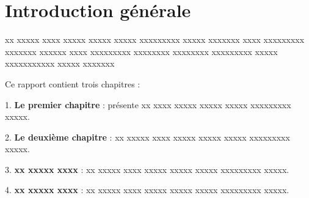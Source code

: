 \chapter*{Introduction générale}
\adjustmtc
\thispagestyle{MyStyle}

xx xxxxx xxxx xxxxx xxxxx xxxxx xxxxxxxxx xxxxx xxxxxxx xxxx xxxxxxxxx xxxxxxx xxxxxx xxxx xxxxxxxxx xxxxxxxx xxxxxxxx xxxxxxxxx xxxxx xxxxxxxxxxx xxxxx xxxxxxx 

Ce rapport contient trois chapitres :

1. \textbf{Le premier chapitre} : présente xx xxxx xxxxx xxxxx xxxxx xxxxxxxxx xxxxx.

2. \textbf{Le deuxième chapitre} : xx xxxxx xxxx xxxxx xxxxx xxxxx xxxxxxxxx xxxxx.

3. \textbf{xx xxxxx xxxx} : xx xxxxx xxxx xxxxx xxxxx xxxxx xxxxxxxxx xxxxx.

4. \textbf{xx xxxxx xxxx} : xx xxxxx xxxx xxxxx xxxxx xxxxx xxxxxxxxx xxxxx.


